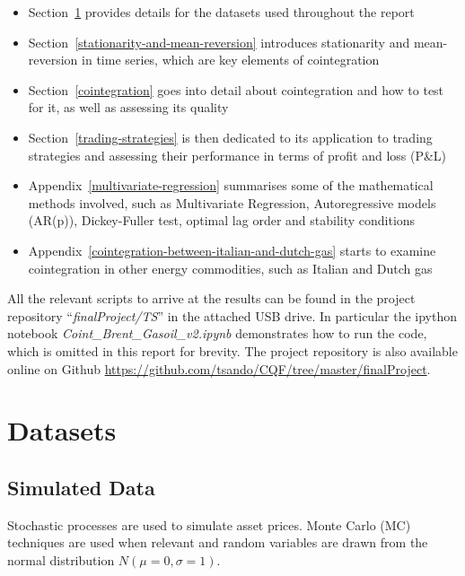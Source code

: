 \documentclass[11pt]{article}
\providecommand{\tightlist}{%
      \setlength{\itemsep}{0pt}\setlength{\parskip}{0pt}}
\begin{document}
\begin{itemize}
\tightlist
\item
  Section~\ref{datasets} provides details for the datasets used throughout the report
\item
  Section~\ref{stationarity-and-mean-reversion} introduces stationarity and mean-reversion in time series, which are key elements of cointegration
\item 
 Section~\ref{cointegration} goes into detail about cointegration and how to test for it,  as well as assessing its quality
\item
  Section~\ref{trading-strategies} is then dedicated to its application  to
  trading strategies and assessing their performance in terms of profit
  and loss (P\&L)
\item Appendix~\ref{multivariate-regression} summarises some of the mathematical methods
  involved, such as Multivariate Regression, Autoregressive models (AR(p)), Dickey-Fuller test, optimal lag order and stability conditions

\item Appendix~\ref{cointegration-between-italian-and-dutch-gas}  starts to examine  cointegration in other energy commodities, such as  Italian and Dutch gas

\end{itemize}

All the relevant scripts  to arrive at the results can be found in the project repository ``\emph{finalProject/TS}'' in the attached USB drive. In particular the ipython notebook \emph{Coint\_Brent\_Gasoil\_v2.ipynb}  demonstrates how to run the code, which is omitted in this report for brevity. The project repository is also available online on Github \url{https://github.com/tsando/CQF/tree/master/finalProject}.


    \section{Datasets}\label{datasets}
    
    
    \subsection{Simulated Data}\label{simulated-data}
    
    
Stochastic processes are used to  simulate asset prices. Monte
Carlo (MC) techniques are used when relevant and  random variables are drawn from the normal distribution $N(\mu=0, \sigma=1)$.
\end{document}
